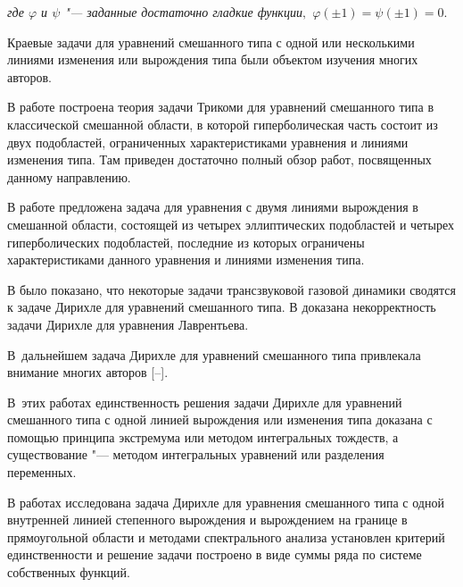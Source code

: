 \it где $\varphi$ и $\psi$ "--- заданные достаточно гладкие функции$,$  $\varphi(\pm 1)=\psi(\pm 1)=0.$

\rm 



\smallskip



Краевые задачи для уравнений смешанного типа с одной или несколькими линиями изменения или вырождения типа были объектом изучения многих авторов.



В работе \cite{gim:bib:mon} построена теория задачи Трикоми для уравнений смешанного типа в классической смешанной области, в которой гиперболическая часть состоит из двух подобластей, ограниченных характеристиками уравнения и линиями изменения типа. Там приведен достаточно полный обзор работ, посвященных данному направлению.



В работе \cite{gim:bib:rasias} предложена задача для уравнения с двумя линиями вырождения в смешанной области, состоящей из четырех эллиптических подобластей и четырех гиперболических подобластей, последние из которых ограничены характеристиками данного уравнения и линиями изменения типа.



В \cite[с.~303]{gim:bib:frankl} было показано, что некоторые задачи трансзвуковой газовой динамики сводятся к задаче Дирихле для уравнений смешанного типа. В \cite{gim:bib:bits} доказана некорректность задачи Дирихле для уравнения Лаврентьева. 

В~дальнейшем задача Дирихле для уравнений смешанного типа привлекала внимание многих авторов [--]. 

В~этих работах  единственность решения задачи Дирихле для уравнений смешанного типа с одной линией вырождения или изменения типа доказана с помощью принципа экстремума или методом интегральных тождеств, а существование "--- методом интегральных уравнений или разделения переменных.



В работах \cite{gim:bib:sab, gim:bib:sab-vag} исследована задача Дирихле для уравнения смешанного типа с одной внутренней линией степенного вырождения и вырождением на границе в прямоугольной области и методами спектрального анализа установлен критерий единственности и решение задачи построено в виде суммы ряда по системе собственных функций.




